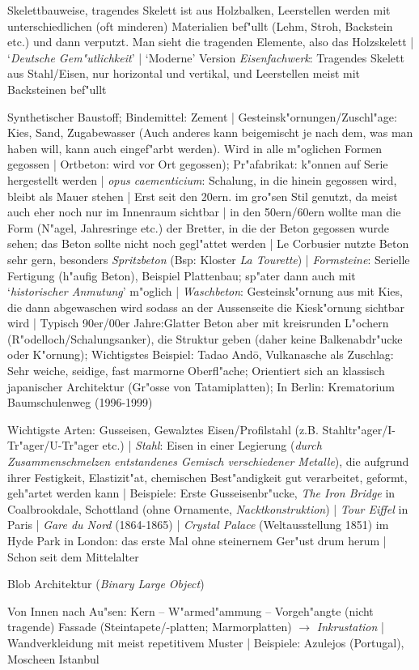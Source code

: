 \documentclass[emulatestandardclasses]{scrartcl}
\begin{document}
\begin{description}[leftmargin=!,labelwidth=\widthof{\bfseries Fachwerk}]
  \item[Fachwerk] Skelettbauweise, tragendes Skelett ist aus Holzbalken, Leerstellen werden mit unterschiedlichen (oft minderen) Materialien bef"ullt (Lehm, Stroh, Backstein etc.) und dann verputzt. Man sieht die tragenden Elemente, also das Holzskelett | `\emph{Deutsche Gem"utlichkeit}' | `Moderne' Version \emph{Eisenfachwerk}: Tragendes Skelett aus Stahl/Eisen, nur horizontal und vertikal, und Leerstellen meist mit Backsteinen bef"ullt
  \item[Beton] Synthetischer Baustoff; Bindemittel: Zement | Gesteinsk"ornungen/Zuschl"age: Kies, Sand, Zugabewasser (Auch anderes kann beigemischt je nach dem, was man haben will, kann auch eingef"arbt werden). Wird in alle m"oglichen Formen gegossen | Ortbeton: wird vor Ort gegossen); Pr"afabrikat: k"onnen auf Serie hergestellt werden | \emph{opus caementicium}: Schalung, in die hinein gegossen wird, bleibt als Mauer stehen | Erst seit den 20ern. im gro"sen Stil genutzt, da meist auch eher noch nur im Innenraum sichtbar | in den 50ern/60ern wollte man die Form (N"agel, Jahresringe etc.) der Bretter, in die der Beton gegossen wurde sehen; das Beton sollte nicht noch gegl"attet werden | Le Corbusier nutzte Beton sehr gern, besonders \emph{Spritzbeton} (Bsp: Kloster \emph{La Tourette}) | \emph{Formsteine}: Serielle Fertigung (h"aufig Beton), Beispiel Plattenbau; sp"ater dann auch mit `\emph{historischer Anmutung}' m"oglich | \emph{Waschbeton}: Gesteinsk"ornung aus mit Kies, die dann abgewaschen wird sodass an der Aussenseite die Kiesk"ornung sichtbar wird | Typisch 90er/00er Jahre:Glatter Beton aber mit kreisrunden L"ochern (R"odelloch/Schalungsanker), die Struktur geben (daher keine Balkenabdr"ucke oder K"ornung); Wichtigstes Beispiel: Tadao Andō, Vulkanasche als Zuschlag: Sehr weiche, seidige, fast marmorne Oberfl"ache; Orientiert sich an klassisch japanischer Architektur (Gr"osse von Tatamiplatten); In Berlin: Krematorium Baumschulenweg (1996-1999)
 \item[Eisen] Wichtigste Arten: Gusseisen, Gewalztes Eisen/Profilstahl (z.B. Stahltr"ager/I-Tr"ager/U-Tr"ager etc.) | \emph{Stahl}: Eisen in einer Legierung (\emph{durch Zusammenschmelzen entstandenes Gemisch verschiedener Metalle}), die aufgrund ihrer Festigkeit, Elastizit"at, chemischen Best"andigkeit gut verarbeitet, geformt, geh"artet werden kann | Beispiele: Erste Gusseisenbr"ucke, \emph{The Iron Bridge} in Coalbrookdale, Schottland (ohne Ornamente, \emph{Nacktkonstruktion}) | \emph{Tour Eiffel} in Paris | \emph{Gare du Nord} (1864-1865) | \emph{Crystal Palace} (Weltausstellung 1851) im Hyde Park in London: das erste Mal ohne steinernem Ger"ust drum herum | Schon seit dem Mittelalter
  \item[Blob] Blob Architektur (\emph{Binary Large Object})
  \item[Fassade] Von Innen nach Au"sen: Kern -- W"armed"ammung -- Vorgeh"angte (nicht tragende) Fassade (Steintapete/-platten; Marmorplatten) $\rightarrow$ \emph{Inkrustation} | Wandverkleidung mit meist repetitivem Muster | Beispiele: Azulejos (Portugal), Moscheen Istanbul
\end{description}
\end{document}

